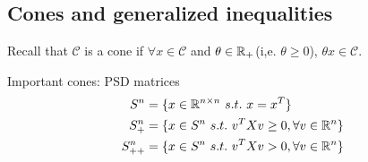 %
%
%	
%	
%
%	
%
%	
%	
%	
%

\vspace{0.4cm}
\subsection{Cones and generalized inequalities}
Recall that
$\mathcal{C}$ is a cone if $\forall x\in \mathcal{C}$ and $\theta \in \mathbb{R}_{+}$(i,e. $\theta \geq 0$), $\theta x\in \mathcal{C}$.   

Important cones: PSD matrices
\begin{align*}
S^n &= \{x\in \mathbb{R}^{n\times n}\ s.t.\ x = x^T \}\\
S^n_+ &= \{x\in S^{n}\ s.t.\ v^TXv \geq 0, \forall v\in \mathbb{R}^n \}\\
S^n_{++} &= \{x\in S^{n}\ s.t.\ v^TXv > 0 ,\forall v\in \mathbb{R}^n\}
\end{align*}

